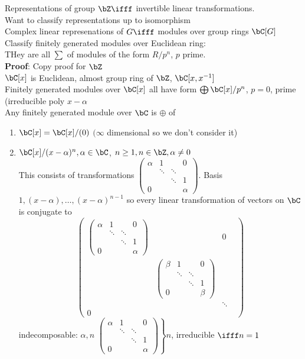 \noindent
Representations of group $\bZ \ifff$ invertible linear transformations. \\
Want to classify representations up to isomorphism \\
Complex linear represenations of $G \ifff$ modules over group rings $\bC[G]$ \\
Classify finitely generated modules over Euclidean ring: \\
THey are all $\sum$ of modules of the form $R/p^n$, $p$ prime. \\
\textbf{Proof}: Copy proof for $\bZ$ \\
$\bC[x]$ is Euclidean, almost group ring of $\bZ$, $\bC[x, x^{-1}]$ \\
Finitely generated modules over $\bC[x]$ all have form $\bigoplus \bC[x]/p^n$, $p = 0$, prime (irreducible poly $x-\alpha$ \\
Any finitely generated module over $\bC$ is $\oplus$ of 
\begin{enumerate}
    \item $\bC[x] = \bC[x]/(0)$ \quad $(\infty$ dimensional so we don't consider it) 
    \item $\bC[x]/(x-\alpha)^n, \alpha \in \bC$, $n \ge 1, n \in \bZ, \alpha \neq 0$ \\
    This consists of transformations $ \begin{pmatrix} \alpha & 1 & & 0 \\ & \ddots & \ddots & \\ & & \ddots & 1 \\ 0 & & & \alpha \end{pmatrix}$. Basis $1, (x-\alpha), \ldots, (x-\alpha)^{n-1}$ so every linear transformation of vectors on $\bC$ is conjugate to 
    \[\begin{pmatrix} \begin{pmatrix} \alpha & 1 & & 0 \\ & \ddots & \ddots & \\ & & \ddots & 1 \\ 0 & & & \alpha \end{pmatrix} & & 0 \\ & \begin{pmatrix} \beta & 1 & & 0 \\ & \ddots & \ddots & \\ & & \ddots & 1 \\ 0 & & & \beta \end{pmatrix} & & \\ & & \ddots & \\ 0 & & & \end{pmatrix} \] 
    indecomposable: $\alpha, n$ $\left. \begin{pmatrix} \alpha & 1 & & 0 \\ & \ddots & \ddots & \\ & & \ddots & 1 \\ 0 & & & \alpha \end{pmatrix} \right \} n$, irreducible $\ifff n=1$ 
\end{enumerate} 

